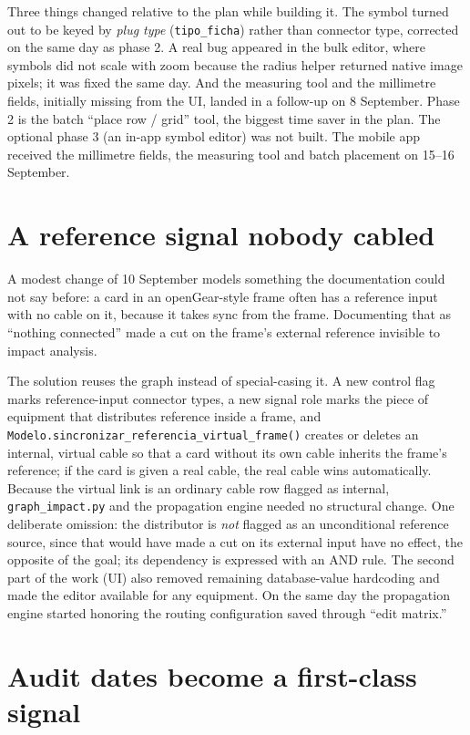 \documentclass[10.4pt,twocolumn]{article}
\begin{document}
Three things changed relative to the plan while building it. The symbol turned out to be keyed by \emph{plug type} (\texttt{tipo\_ficha}) rather than connector type, corrected on the same day as phase 2. A real bug appeared in the bulk editor, where symbols did not scale with zoom because the radius helper returned native image pixels; it was fixed the same day. And the measuring tool and the millimetre fields, initially missing from the UI, landed in a follow-up on 8 September. Phase 2 is the batch ``place row / grid'' tool, the biggest time saver in the plan. The optional phase 3 (an in-app symbol editor) was not built. The mobile app received the millimetre fields, the measuring tool and batch placement on 15--16 September.

\section{A reference signal nobody cabled}

A modest change of 10 September models something the documentation could not say before: a card in an openGear-style frame often has a reference input with no cable on it, because it takes sync from the frame. Documenting that as ``nothing connected'' made a cut on the frame's external reference invisible to impact analysis.

The solution reuses the graph instead of special-casing it. A new control flag marks reference-input connector types, a new signal role marks the piece of equipment that distributes reference inside a frame, and \texttt{Modelo.sincronizar\_referencia\_virtual\_frame()} creates or deletes an internal, virtual cable so that a card without its own cable inherits the frame's reference; if the card is given a real cable, the real cable wins automatically. Because the virtual link is an ordinary cable row flagged as internal, \texttt{graph\_impact.py} and the propagation engine needed no structural change. One deliberate omission: the distributor is \emph{not} flagged as an unconditional reference source, since that would have made a cut on its external input have no effect, the opposite of the goal; its dependency is expressed with an AND rule. The second part of the work (UI) also removed remaining database-value hardcoding and made the editor available for any equipment. On the same day the propagation engine started honoring the routing configuration saved through ``edit matrix.''

\section{Audit dates become a first-class signal}
\end{document}
